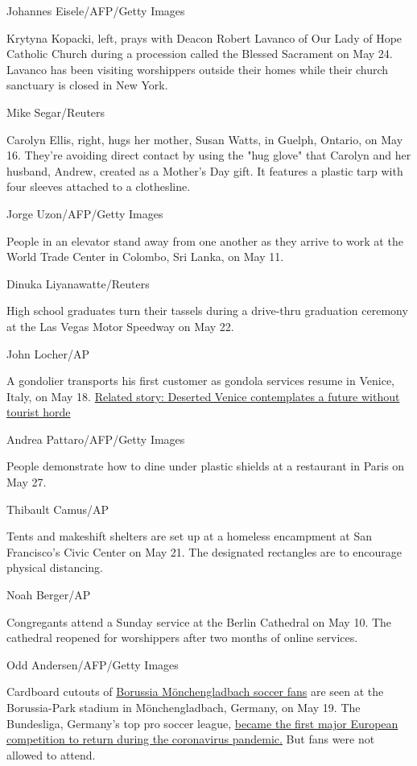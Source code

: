 Johannes Eisele/AFP/Getty Images

Krytyna Kopacki, left, prays with Deacon Robert Lavanco of Our Lady of
Hope Catholic Church during a procession called the Blessed Sacrament on
May 24. Lavanco has been visiting worshippers outside their homes while
their church sanctuary is closed in New York.

Mike Segar/Reuters

Carolyn Ellis, right, hugs her mother, Susan Watts, in Guelph, Ontario,
on May 16. They're avoiding direct contact by using the "hug glove" that
Carolyn and her husband, Andrew, created as a Mother's Day gift. It
features a plastic tarp with four sleeves attached to a clothesline.

Jorge Uzon/AFP/Getty Images

People in an elevator stand away from one another as they arrive to work
at the World Trade Center in Colombo, Sri Lanka, on May 11.

Dinuka Liyanawatte/Reuters

High school graduates turn their tassels during a drive-thru graduation
ceremony at the Las Vegas Motor Speedway on May 22.

John Locher/AP

A gondolier transports his first customer as gondola services resume in
Venice, Italy, on May 18.
\href{http://www.cnn.com/travel/article/venice-future-covid-19/index.html}{Related
story: Deserted Venice contemplates a future without tourist horde}

Andrea Pattaro/AFP/Getty Images

People demonstrate how to dine under plastic shields at a restaurant in
Paris on May 27.

Thibault Camus/AP

Tents and makeshift shelters are set up at a homeless encampment at San
Francisco's Civic Center on May 21. The designated rectangles are to
encourage physical distancing.

Noah Berger/AP

Congregants attend a Sunday service at the Berlin Cathedral on May 10.
The cathedral reopened for worshippers after two months of online
services.

Odd Andersen/AFP/Getty Images

Cardboard cutouts of
\href{https://www.bundesliga.com/en/bundesliga/news/borussia-monchengladbach-fans-pay-for-cardboard-cut-outs-charity-coronavirus-10911}{Borussia
Mönchengladbach soccer fans} are seen at the Borussia-Park stadium in
Mönchengladbach, Germany, on May 19. The Bundesliga, Germany's top pro
soccer league,
\href{https://www.cnn.com/2020/05/16/sport/germany-bundesliga-return-football-spt-intl/index.html}{became
the first major European competition to return during the coronavirus
pandemic.} But fans were not allowed to attend.

